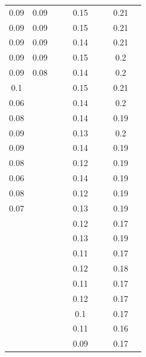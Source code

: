 \documentclass[AutoFakeBold]{LZUThesis}
\begin{document}
\begin{longtable}{ccccccccc}
0.09   & 0.09   &        &       & 0.15  &      &       & 0.21  &      \\
0.09   & 0.09   &        &       & 0.15  &      &       & 0.21  &      \\
0.09   & 0.09   &        &       & 0.14  &      &       & 0.21  &      \\
0.09   & 0.09   &        &       & 0.15  &      &       & 0.2   &      \\
0.09   & 0.08   &        &       & 0.14  &      &       & 0.2   &      \\
0.1    &        &        &       & 0.15  &      &       & 0.21  &      \\
0.06   &        &        &       & 0.14  &      &       & 0.2   &      \\
0.08   &        &        &       & 0.14  &      &       & 0.19  &      \\
0.09   &        &        &       & 0.13  &      &       & 0.2   &      \\
0.09   &        &        &       & 0.14  &      &       & 0.19  &      \\
0.08   &        &        &       & 0.12  &      &       & 0.19  &      \\
0.06   &        &        &       & 0.14  &      &       & 0.19  &      \\
0.08   &        &        &       & 0.12  &      &       & 0.19  &      \\
0.07   &        &        &       & 0.13  &      &       & 0.19  &      \\
       &        &        &       & 0.12  &      &       & 0.17  &      \\
       &        &        &       & 0.13  &      &       & 0.19  &      \\
       &        &        &       & 0.11  &      &       & 0.17  &      \\
       &        &        &       & 0.12  &      &       & 0.18  &      \\
       &        &        &       & 0.11  &      &       & 0.17  &      \\
       &        &        &       & 0.12  &      &       & 0.17  &      \\
       &        &        &       & 0.1   &      &       & 0.17  &      \\
       &        &        &       & 0.11  &      &       & 0.16  &      \\
       &        &        &       & 0.09  &      &       & 0.17  &      \\

\end{longtable}
\end{document}

